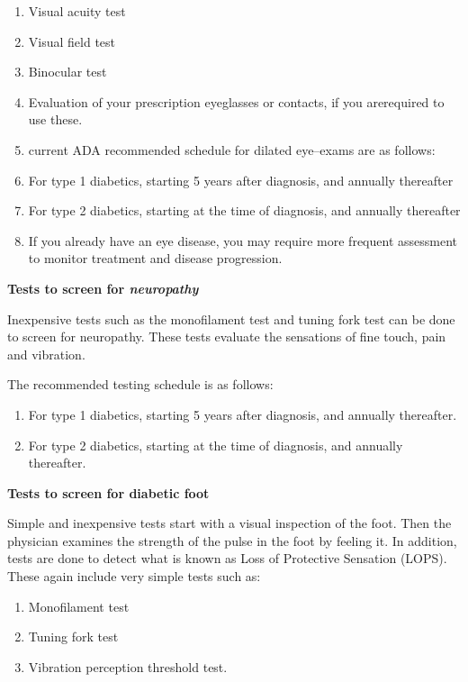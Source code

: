 \begin{enumerate}[•]
\itemsep=0pt
\item Visual acuity test
\item Visual field test
\item Binocular test
\item Evaluation of your prescription eyeglasses or contacts, if you are\break required to use these.
\item current ADA recommended schedule for dilated eye–exams are as follows:
\item For type 1 diabetics, starting 5 years after diagnosis, and annually thereafter
\item For type 2 diabetics, starting at the time of diagnosis, and annually thereafter
\item If you already have an eye disease, you may require more frequent assessment to monitor treatment and disease progression.
\end{enumerate}

\noindent\textbf{Tests to screen for \textit{neuropathy}}

Inexpensive tests such as the monofilament test and tuning fork test can be done to screen for neuropathy. These tests evaluate the sensations of fine touch, pain and vibration.

\noindent The recommended testing schedule is as follows:

\begin{enumerate}[•]
\itemsep=0pt
\item For type 1 diabetics, starting 5 years after diagnosis, and annually thereafter.
\item For type 2 diabetics, starting at the time of diagnosis, and annually thereafter.
\end{enumerate}

\noindent\textbf{Tests to screen for diabetic foot}

Simple and inexpensive tests start with a visual inspection of the foot. Then the physician examines the strength of the pulse in the foot by feeling it. In addition, tests are done to detect what is known as Loss of Protective Sensation (LOPS). These again include very simple tests such as:

\begin{enumerate}[•]
\itemsep=0pt
\item Monofilament test
\item Tuning fork test
\item Vibration perception threshold test.
\end{enumerate}

